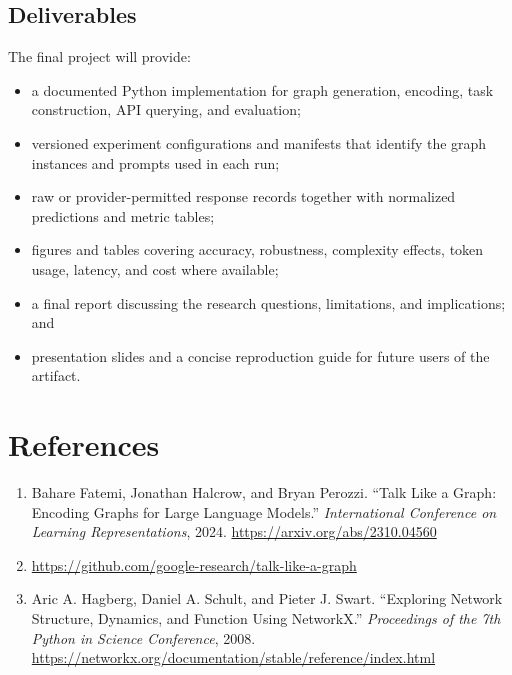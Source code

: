 \documentclass[11pt,a4paper]{article}
\begin{document}
\subsection{Deliverables}

The final project will provide:

\begin{itemize}
\item a documented Python implementation for graph generation, encoding, task construction, API querying, and evaluation;
\item versioned experiment configurations and manifests that identify the graph instances and prompts used in each run;
\item raw or provider-permitted response records together with normalized predictions and metric tables;
\item figures and tables covering accuracy, robustness, complexity effects, token usage, latency, and cost where available;
\item a final report discussing the research questions, limitations, and implications; and
\item presentation slides and a concise reproduction guide for future users of the artifact.
\end{itemize}

\section*{References}
\begin{enumerate}
\item Bahare Fatemi, Jonathan Halcrow, and Bryan Perozzi. “Talk Like a Graph: Encoding Graphs for Large Language Models.” \emph{International Conference on Learning Representations}, 2024. \url{https://arxiv.org/abs/2310.04560}
\item \url{https://github.com/google-research/talk-like-a-graph}
\item Aric A. Hagberg, Daniel A. Schult, and Pieter J. Swart. “Exploring Network Structure, Dynamics, and Function Using NetworkX.” \emph{Proceedings of the 7th Python in Science Conference}, 2008. \url{https://networkx.org/documentation/stable/reference/index.html}
\end{enumerate}
\end{document}
